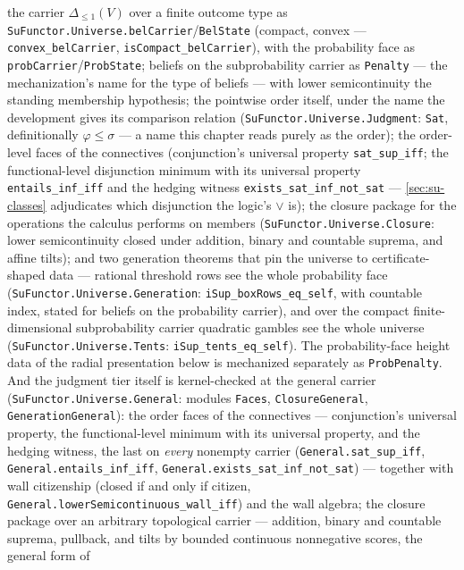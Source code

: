 \begin{remark}
the carrier $\Delta_{\le 1}(V)$ over a finite
outcome type as
\texttt{SuFunctor.Universe.belCarrier}/\texttt{BelState} (compact,
convex --- \texttt{convex\_belCarrier},
\texttt{isCompact\_belCarrier}), with the probability face as
\texttt{probCarrier}/\texttt{ProbState}; beliefs on the
subprobability carrier as \texttt{Penalty} --- the mechanization's
name for the type of beliefs --- with lower
semicontinuity the standing membership hypothesis; the pointwise
order itself, under the name the development gives its comparison
relation (\texttt{SuFunctor.Universe.Judgment}: \texttt{Sat},
definitionally $\varphi \le \sigma$ --- a name this chapter reads
purely as the order); the order-level faces of
the connectives (conjunction's universal property
\texttt{sat\_sup\_iff}; the functional-level disjunction minimum
with its universal property \texttt{entails\_inf\_iff} and the
hedging witness \texttt{exists\_sat\_inf\_not\_sat} ---
\autoref{sec:su-classes} adjudicates which disjunction the
logic's $\vee$ is); the closure package for the operations the
calculus performs on members (\texttt{SuFunctor.Universe.Closure}:
lower semicontinuity closed under addition, binary and countable
suprema, and affine tilts); and two generation theorems that pin the
universe to certificate-shaped data --- rational threshold rows see
the whole probability face (\texttt{SuFunctor.Universe.Generation}:
\texttt{iSup\_boxRows\_eq\_self}, with countable index, stated for
beliefs on the probability carrier), and over the
compact finite-dimensional subprobability carrier quadratic gambles
see the whole universe
(\texttt{SuFunctor.Universe.Tents}: \texttt{iSup\_tents\_eq\_self}).
The probability-face height data of the radial presentation below is
mechanized separately as \texttt{ProbPenalty}. And the judgment tier
itself is kernel-checked at the general carrier
(\texttt{SuFunctor.Universe.General}: modules \texttt{Faces},
\texttt{ClosureGeneral}, \texttt{GenerationGeneral}): the order
faces of the connectives --- conjunction's universal property, the
functional-level minimum with its universal property, and the
hedging witness, the last on \emph{every} nonempty carrier
(\texttt{General.sat\_sup\_iff}, \texttt{General.entails\_inf\_iff},
\texttt{General.exists\_sat\_inf\_not\_sat}) --- together with wall
citizenship (closed if and only if citizen,
\texttt{General.lowerSemicontinuous\_wall\_iff}) and the wall
algebra; the closure package over an arbitrary topological carrier
--- addition, binary and countable suprema, pullback, and tilts by
bounded continuous nonnegative scores, the general form of

\end{remark}
